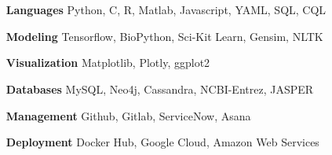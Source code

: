 \documentclass[hidelinks, 10pt]{article}
\begin{document}
\section*{}
\begin{addmargin}{1.7in}
\begin{itemize}\setlength\itemsep{-4pt}
	\item[{\bf Languages}]{Python, C, R, Matlab, Javascript, YAML, SQL, CQL}
	\item[{\bf Modeling}]{Tensorflow, BioPython, Sci-Kit Learn, Gensim, NLTK}
    \item[{\bf Visualization}]{Matplotlib, Plotly, ggplot2}
    \item[{\bf Databases}]{MySQL, Neo4j, Cassandra, NCBI-Entrez, JASPER}
    \item[{\bf Management}]{Github, Gitlab, ServiceNow, Asana}
    \item[{\bf Deployment}]{Docker Hub, Google Cloud, Amazon Web Services}
\end{itemize}
\end{addmargin}
\vspace{6pt}

\end{document}

